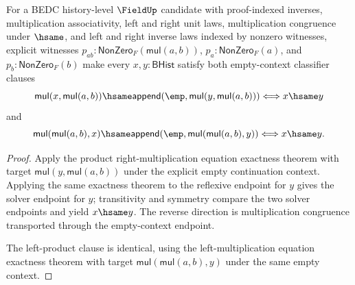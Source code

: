 \begin{theorem}
\label{thm:field-product-factor-map-empty-context-classifier-exact-from-apartness}
For a BEDC history-level $\FieldUp$ candidate with proof-indexed inverses,
multiplication associativity, left and right unit laws, multiplication
congruence under $\hsame$, and left and right inverse laws indexed by nonzero
witnesses, explicit witnesses
$p_{ab}:\mathsf{NonZero}_F(\mathsf{mul}(a,b))$,
$p_a:\mathsf{NonZero}_F(a)$, and $p_b:\mathsf{NonZero}_F(b)$ make every
$x,y:\mathsf{BHist}$ satisfy both empty-context classifier clauses
$$
\mathsf{mul}(x,\mathsf{mul}(a,b))\hsame
\mathsf{append}(\emp,\mathsf{mul}(y,\mathsf{mul}(a,b)))
\Longleftrightarrow
x\hsame y
$$
and
$$
\mathsf{mul}(\mathsf{mul}(a,b),x)\hsame
\mathsf{append}(\emp,\mathsf{mul}(\mathsf{mul}(a,b),y))
\Longleftrightarrow
x\hsame y.
$$
\end{theorem}
\begin{proof}
Apply the product right-multiplication equation exactness theorem with target
$\mathsf{mul}(y,\mathsf{mul}(a,b))$ under the explicit empty continuation
context. Applying the same exactness theorem to the reflexive endpoint for
$y$ gives the solver endpoint for $y$; transitivity and symmetry compare the
two solver endpoints and yield $x\hsame y$. The reverse direction is
multiplication congruence transported through the empty-context endpoint.

The left-product clause is identical, using the left-multiplication equation
exactness theorem with target $\mathsf{mul}(\mathsf{mul}(a,b),y)$ under the
same empty context.
\end{proof}

